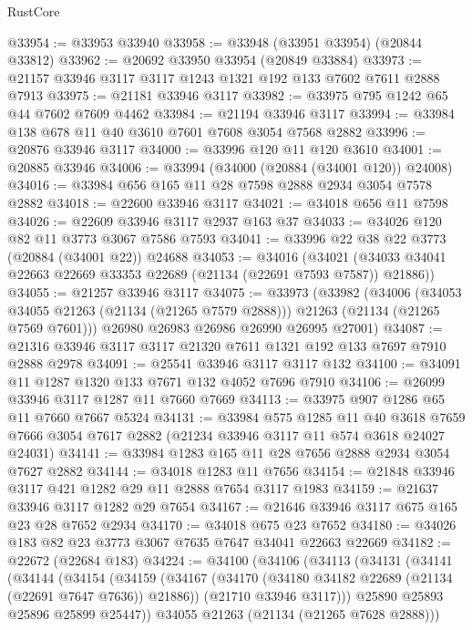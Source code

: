 \begin{lexlean}{RustCore}
\begin{coremodule}
@33954 := @33953 @33940
@33958 := @33948 (@33951 @33954) (@20844 @33812)
@33962 := @20692 @33950 @33954 (@20849 @33884)
@33973 := @21157 @33946 @3117 @3117 @1243 @1321 @192 @133 @7602 @7611 @2888 @7913
@33975 := @21181 @33946 @3117
@33982 := @33975 @795 @1242 @65 @44 @7602 @7609 @4462
@33984 := @21194 @33946 @3117
@33994 := @33984 @138 @678 @11 @40 @3610 @7601 @7608 @3054 @7568 @2882
@33996 := @20876 @33946 @3117
@34000 := @33996 @120 @11 @120 @3610
@34001 := @20885 @33946
@34006 := @33994 (@34000 (@20884 (@34001 @120)) @24008)
@34016 := @33984 @656 @165 @11 @28 @7598 @2888 @2934 @3054 @7578 @2882
@34018 := @22600 @33946 @3117
@34021 := @34018 @656 @11 @7598
@34026 := @22609 @33946 @3117 @2937 @163 @37
@34033 := @34026 @120 @82 @11 @3773 @3067 @7586 @7593
@34041 := @33996 @22 @38 @22 @3773 (@20884 (@34001 @22)) @24688
@34053 := @34016
    (@34021 (@34033 @34041 @22663 @22669 @33353 @22689 (@21134 (@22691 @7593 @7587)) @21886))
@34055 := @21257 @33946 @3117
@34075 := @33973
    (@33982
      (@34006
        (@34053 @34055 @21263 (@21134 (@21265 @7579 @2888)))
        @21263
        (@21134 (@21265 @7569 @7601)))
      @26980
      @26983
      @26986
      @26990
      @26995
      @27001)
@34087 := @21316 @33946 @3117 @3117 @21320 @7611 @1321 @192 @133 @7697 @7910 @2888 @2978
@34091 := @25541 @33946 @3117 @3117 @132
@34100 := @34091 @11 @1287 @1320 @133 @7671 @132 @4052 @7696 @7910
@34106 := @26099 @33946 @3117 @1287 @11 @7660 @7669
@34113 := @33975 @907 @1286 @65 @11 @7660 @7667 @5324
@34131 := @33984
    @575
    @1285
    @11
    @40
    @3618
    @7659
    @7666
    @3054
    @7617
    @2882
    (@21234 @33946 @3117 @11 @574 @3618 @24027 @24031)
@34141 := @33984 @1283 @165 @11 @28 @7656 @2888 @2934 @3054 @7627 @2882
@34144 := @34018 @1283 @11 @7656
@34154 := @21848 @33946 @3117 @421 @1282 @29 @11 @2888 @7654 @3117 @1983
@34159 := @21637 @33946 @3117 @1282 @29 @7654
@34167 := @21646 @33946 @3117 @675 @165 @23 @28 @7652 @2934
@34170 := @34018 @675 @23 @7652
@34180 := @34026 @183 @82 @23 @3773 @3067 @7635 @7647 @34041 @22663 @22669
@34182 := @22672 (@22684 @183)
@34224 := @34100
    (@34106
      (@34113
        (@34131
          (@34141
            (@34144
              (@34154
                (@34159
                  (@34167
                    (@34170 (@34180 @34182 @22689 (@21134 (@22691 @7647 @7636)) @21886))
                    (@21710 @33946 @3117)))
                @25890
                @25893
                @25896
                @25899
                @25447))
            @34055
            @21263
            (@21134 (@21265 @7628 @2888)))

\end{coremodule}
\end{lexlean}

